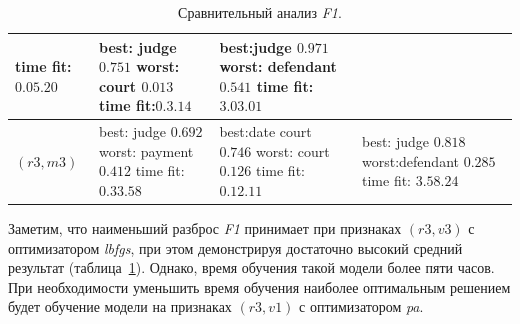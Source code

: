 \documentclass{csmathnotes}
\begin{document}
\begin{table}[!h]
\begin{center}
\begin{tabular}{|p{2.1cm}|p{2.5cm}|p{2.5cm}|p{2.5cm}|}
            time fit:\newline $0.05.20$ \newline
            & best: \newline judge    $0.751$ \newline
              worst: \newline court  $0.013$ \newline
              time fit:\newline $0.3.14$
            & best:\newline  judge $0.971$\newline
              worst: \newline defendant  $0.541$\newline
              time fit:\newline $3.03.01$\\
            \hline
            $(r3, m3)$
            & best: \newline judge $0.692$ \newline
            worst: \newline payment $0.412$ \newline
            time fit: \newline  $0.33.58$
            & best:\newline   date court   $0.746$ \newline
             worst: \newline court $0.126$ \newline
             time fit: \newline $0.12.11$
            & best: \newline   judge $0.818$ \newline
              worst:\newline defendant $0.285$ \newline 
              time fit: \newline $3.58.24$\\
            \hline
        \end{tabular}
    \end{center}
    \caption{\label{tabl:table2}Сравнительный анализ \emph{F1}.}
\end{table}

Заметим, что наименьший разброс \emph{F1}  принимает при признаках $(r3,v3)$ с оптимизатором \emph{lbfgs}, при этом демонстрируя достаточно высокий средний результат (таблица~\ref{tabl:table2}). Однако, время обучения такой модели более пяти часов. При необходимости уменьшить время обучения наиболее оптимальным решением будет обучение модели на признаках $(r3,v1)$ с оптимизатором \emph{pa}.
\end{document}
